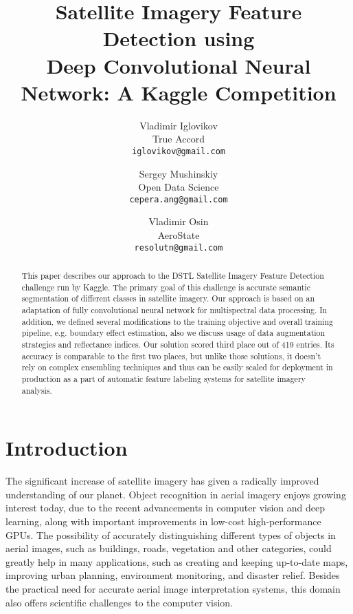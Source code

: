 \documentclass[10pt,twocolumn,letterpaper]{article}
\begin{document}
\title{Satellite Imagery Feature Detection using \\ Deep Convolutional Neural Network: A Kaggle Competition}

\author{Vladimir Iglovikov\\
True Accord\\
{\tt\small iglovikov@gmail.com}
\and
Sergey Mushinskiy\\
Open Data Science\\
{\tt\small cepera.ang@gmail.com}
\and
Vladimir Osin\\
AeroState\\
{\tt\small resolutn@gmail.com}
}

\maketitle

\begin{abstract}
This paper describes our approach to the DSTL Satellite Imagery Feature Detection challenge \cite{dstl_competition} run by Kaggle. The primary goal of this challenge is accurate semantic segmentation of different classes in satellite imagery. Our approach is based on an adaptation of fully convolutional neural network for multispectral data processing.  In addition, we defined several modifications to the training objective and overall training pipeline, e.g. boundary effect estimation, also we discuss usage of data augmentation strategies and reflectance indices. Our solution scored third place out of 419 entries. Its accuracy is comparable to the first two places, but unlike those solutions, it doesn't rely on complex ensembling techniques and thus can be easily scaled for deployment in production as a part of automatic feature labeling systems for satellite imagery analysis.
\end{abstract}

\section{Introduction}
The significant increase of satellite imagery has given a radically improved understanding of our planet. Object recognition in aerial imagery enjoys growing interest today, due to the recent advancements in computer vision and deep learning, along with important improvements in low-cost high-performance GPUs. The possibility of accurately distinguishing different types of objects in aerial images, such as buildings, roads, vegetation and other categories, could greatly help in many applications, such as creating and keeping up-to-date maps, improving urban planning, environment monitoring, and disaster relief. Besides the practical need for accurate aerial image interpretation systems, this domain also offers scientific challenges to the computer vision.
\end{document}
